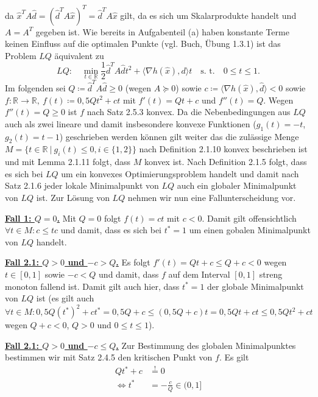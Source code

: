 \documentclass[ngerman, a4paper,12pt]{article}
\begin{document}
da $\hat{x}^TA\hat{d} = (\hat{d}^TA\hat{x})^T =  \hat{d}^TA\hat{x}$ gilt, da es sich um Skalarprodukte handelt und $A=A^T$ gegeben ist. Wie bereits in Aufgabenteil (a) haben konstante Terme keinen Einfluss auf die optimalen Punkte (vgl. Buch, Übung 1.3.1) ist das Problem $LQ$ äquivalent zu
\begin{equation*}
	LQ: \quad \min_{t \in \mathbb{R}} \frac{1}{2} \hat{d}^TA\hat{d}t^2 + \langle \nabla h(\hat{x}), d \rangle t \quad \text{s. t.} \quad 0\leq t \leq 1.
\end{equation*}
Im folgenden sei $Q \coloneqq \hat{d}^TA\hat{d}\geq 0$ (wegen $A \succeq 0$) sowie $c \coloneqq \langle \nabla h(\hat{x}), \hat{d} \rangle < 0$ sowie $f: \mathbb{R} \rightarrow \mathbb{R}, \ f(t) \coloneqq 0,5Qt^2+ct$ mit $f'(t)=Qt+c$ und $f''(t)=Q$. Wegen $f''(t)=Q\geq 0$ ist $f$ nach Satz 2.5.3 konvex. Da die Nebenbedingungen aus $LQ$ auch als zwei lineare und damit insbesondere konvexe Funktionen ($g_1(t)=-t$, $g_2(t)=t-1$) geschrieben werden können gilt weiter das die zulässige Menge $M = \{t \in \mathbb{R} \ | \ g_i(t) \leq 0, i\in \{1,2\} \}$ nach Definition 2.1.10 konvex beschrieben ist und mit Lemma 2.1.11 folgt, dass $M$ konvex ist. Nach Definition 2.1.5 folgt, dass es sich bei $LQ$ um ein konvexes Optimierungsproblem handelt und damit nach Satz 2.1.6 jeder lokale Minimalpunkt von $LQ$ auch ein globaler Minimalpunkt von $LQ$ ist. Zur Lösung von $LQ$ nehmen wir nun eine Fallunterscheidung vor. \par
\textbf{\underline{Fall 1: $Q = 0$.}}
Mit $Q=0$ folgt $f(t)=ct$ mit $c<0$. Damit gilt offensichtlich $\forall t \in M: c \leq tc$ und damit, dass es sich bei $t^*=1$ um einen gobalen Minimalpunkt von $LQ$ handelt. \par
\textbf{\underline{Fall 2.1: $Q > 0$ und $-c > Q$.}} Es folgt $f'(t)=Qt+c \leq Q+c < 0$ wegen $t \in [0,1]$ sowie $-c < Q$ und damit, dass $f$ auf dem Interval $[0,1]$ streng monoton fallend ist. Damit gilt auch hier, dass $t^*=1$ der globale Minimalpunkt von $LQ$ ist (es gilt auch $\forall t \in M: 0,5Q(t^*)^2 +ct^* = 0,5Q+c \leq (0,5Q+c)t = 0,5Qt + ct \leq 0,5Qt^2+ct$ wegen $Q+c<0$, $ Q > 0$ und $0 \leq t \leq 1$). \par
\textbf{\underline{Fall 2.1: $Q > 0$ und $-c \leq Q$.}} Zur Bestimmung des globalen Minimalpunktes bestimmen wir mit Satz 2.4.5 den kritischen Punkt von $f$. Es gilt
\begin{equation*}
	\begin{split}
		Qt^*+c &\stackrel{!}{=} 0 \\
	\Leftrightarrow	t^* &= -\frac{c}{Q} \in (0,1]
	\end{split}
\end{equation*}
\end{document}
